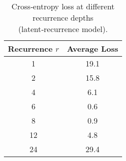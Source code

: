\begin{table}[!ht]
\centering
\begin{tabular}{|c|c|}
\hline
\textbf{Recurrence \(r\)} & \textbf{Average Loss} \\ \hline
1  & 19.1 \\
2  & 15.8 \\
4  &  6.1 \\
6  &  0.6 \\
8  &  0.9 \\
12 &  4.8 \\
24 & 29.4 \\ \hline
\end{tabular}
\caption{Cross‑entropy loss at different recurrence depths (latent‑recurrence model).}
\label{tab:rec_results}
\end{table}
